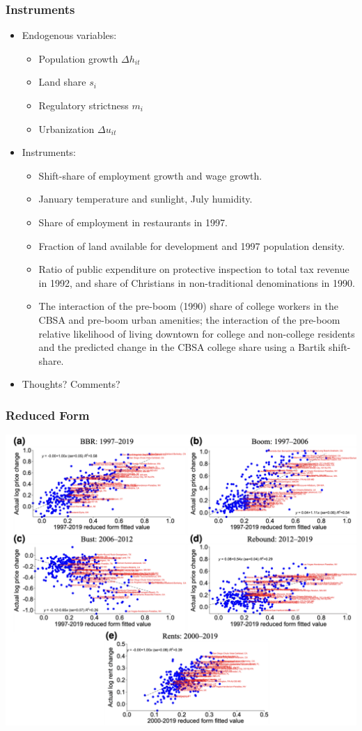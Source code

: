\documentclass[english,xcolor=svgnames]{beamer}
\begin{document}
\begin{frame}
	\frametitle[alignment=center]{Instruments}
	\begin{itemize}
		\item Endogenous variables:
		\begin{itemize}
			\item Population growth $\Delta h_{it}$
			\item Land share $s_i$
			\item Regulatory strictness $m_i$
			\item Urbanization $\Delta u_{it}$
		\end{itemize}
		\item Instruments:
		\begin{itemize}
			\item Shift-share of employment growth and wage growth.
			\item January temperature and sunlight, July humidity.
			\item Share of employment in restaurants in 1997.
			\item Fraction of land available for development and 1997 population density.
			\item Ratio of public expenditure on protective inspection to total tax revenue in 1992, and share of Christians in non-traditional denominations in 1990.
			\item  The interaction of the pre-boom (1990) share of college workers
			in the CBSA and pre-boom urban amenities;  the interaction of the pre-boom relative likelihood of living downtown for college and non-college residents and the predicted change in the CBSA college share using a Bartik shift-share.
		\end{itemize}
		\item Thoughts? Comments?
	\end{itemize}
\end{frame}

\begin{frame}
	\frametitle[alignment=center]{Reduced Form}
	\centering
	\includegraphics[scale=0.4]{figures/CGMFIG4.png}
\end{frame}
\end{document}
